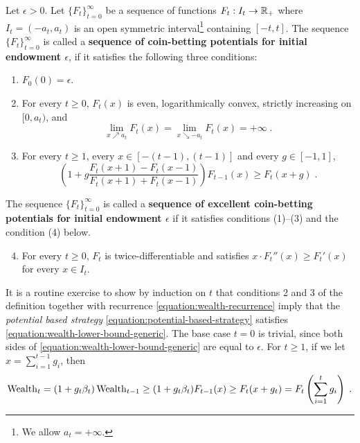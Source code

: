 \begin{definition}
\label{definition:potential}
Let $\epsilon > 0$. Let $\{F_t\}_{t=0}^\infty$ be a sequence of functions
$F_t:I_t  \to \mathbb{R}_+$ where $I_t = (-a_t, a_t)$ is an open symmetric
interval\footnote{We allow $a_t = +\infty$.} containing $[-t,t]$.  The sequence
$\{F_t\}_{t=0}^\infty$ is called a \textbf{sequence of coin-betting potentials
for initial endowment $\epsilon$}, if it satisfies the following three
conditions:
\begin{enumerate}[(1)]
\item $F_0(0) = \epsilon$.

\item For every $t \ge 0$, $F_t(x)$ is even, logarithmically convex, strictly
increasing on $[0,a_t)$, and
\begin{equation}
\label{equation:potential-limit-assumption}
\lim_{x \nearrow a_t} F_t(x) = \lim_{x \searrow -a_t} F_t(x) = +\infty \; .
\end{equation}

\item For every $t \ge 1$, every $x \in [-(t-1), (t-1)]$ and every $g \in [-1,1]$,
$$
\left(1 + g \frac{F_t(x + 1) - F_t(x - 1)}{F_t(x + 1) + F_t(x - 1)} \right) F_{t-1}(x) \ge F_t(x+g) \; .
$$
\end{enumerate}
The sequence $\{F_t\}_{t=0}^\infty$ is called a
\textbf{sequence of excellent coin-betting potentials for initial
endowment $\epsilon$} if it satisfies conditions (1)--(3) and the condition (4)
below.
\begin{enumerate}[(1)]
\setcounter{enumi}{3}
\item For every $t \ge 0$, $F_t$ is twice-differentiable and
satisfies $x \cdot F_t''(x) \ge F_t'(x)$ for every $x \in I_t$.
\end{enumerate}
\end{definition}

It is a routine exercise to show by induction on $t$ that conditions 2 and 3 of
the definition together with recurrence \eqref{equation:wealth-recurrence} imply
that the \emph{potential based strategy}
\eqref{equation:potential-based-strategy} satisfies
\eqref{equation:wealth-lower-bound-generic}. The base case $t=0$ is trivial,
since both sides of \eqref{equation:wealth-lower-bound-generic} are equal to
$\epsilon$. For $t \ge 1$, if we let $x = \sum_{i=1}^{t-1} g_i$, then
$$
\operatorname{Wealth}_t
= (1+g_t \beta_t) \operatorname{Wealth}_{t-1}
\ge (1 + g_t \beta_t) F_{t-1}(x)
\ge F_t(x + g_t)
= F_t \left( \sum_{i=1}^t g_i \right) \; .
$$

